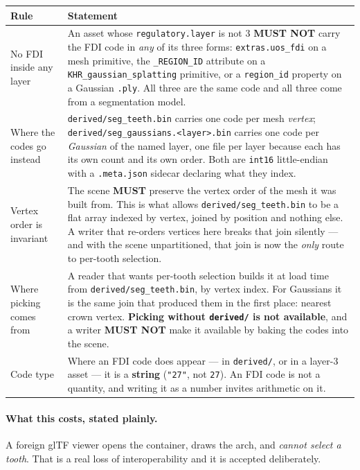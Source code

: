 \documentclass[11pt,a4paper]{article}
\newcommand{\MUST}{\textcolor{uosred}{\textbf{MUST}}}
\newcommand{\MUSTNOT}{\textcolor{uosred}{\textbf{MUST NOT}}}
\newcommand{\code}[1]{\texttt{\small #1}}
\begin{document}
\begin{longtable}{L{4.2cm} L{11.2cm}}
\toprule
\textbf{Rule} & \textbf{Statement}\\
\midrule
\endhead
No FDI inside any layer & An asset whose \code{regulatory.layer} is not 3 \MUSTNOT{}
carry the FDI code in \emph{any} of its three forms: \code{extras.uos\_fdi} on a mesh
primitive, the \code{\_REGION\_ID} attribute on a \code{KHR\_gaussian\_splatting}
primitive, or a \code{region\_id} property on a Gaussian \code{.ply}. All three are the
same code and all three come from a segmentation model.\\
Where the codes go instead & \code{derived/seg\_teeth.bin} carries one code per mesh
\emph{vertex}; \code{derived/seg\_gaussians.<layer>.bin} carries one code per
\emph{Gaussian} of the named layer, one file per layer because each has its own count and
its own order. Both are \code{int16} little-endian with a \code{.meta.json} sidecar
declaring what they index.\\
Vertex order is invariant & The scene \MUST{} preserve the vertex order of the mesh it was
built from. This is what allows \code{derived/seg\_teeth.bin} to be a flat array indexed by
vertex, joined by position and nothing else. A writer that re-orders vertices here breaks
that join silently --- and with the scene unpartitioned, that join is now the \emph{only}
route to per-tooth selection.\\
Where picking comes from & A reader that wants per-tooth selection builds it at load time
from \code{derived/seg\_teeth.bin}, by vertex index. For Gaussians it is the same join that
produced them in the first place: nearest crown vertex. \textbf{Picking without
\code{derived/} is not available}, and a writer \MUSTNOT{} make it available by baking the
codes into the scene.\\
Code type & Where an FDI code does appear --- in \code{derived/}, or in a layer-3 asset ---
it is a \textbf{string} (\code{"27"}, not \code{27}). An FDI code is not a quantity, and
writing it as a number invites arithmetic on it.\\
\bottomrule
\end{longtable}

\paragraph{What this costs, stated plainly.}
A foreign glTF viewer opens the container, draws the arch, and \emph{cannot select a
tooth}. That is a real loss of interoperability and it is accepted deliberately.
\end{document}
